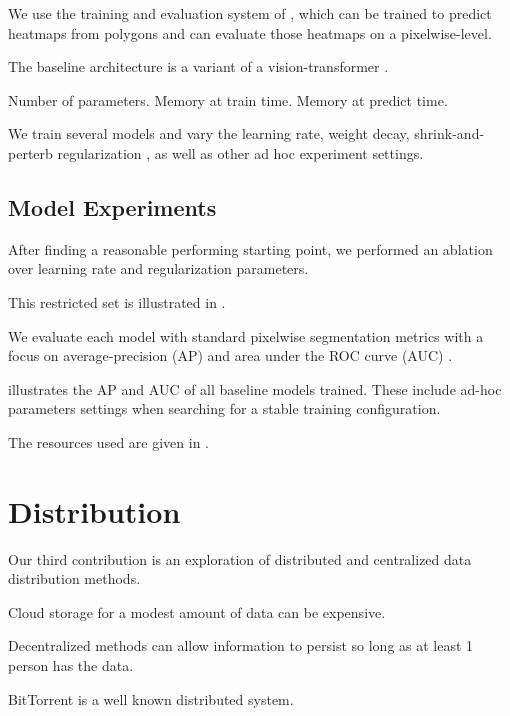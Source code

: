 \documentclass[10pt,twocolumn,letterpaper]{article}
\begin{document}
We use the training and evaluation system of \cite{crall_igarss_2024}, which
can be trained to predict heatmaps from polygons and can evaluate those
heatmaps on a pixelwise-level. 

The baseline architecture is a variant of a vision-transformer \cite{vit,split-attention,greenwell_wacv_2023}.

Number of parameters.
Memory at train time.
Memory at predict time.

We train several models and vary the learning rate, weight decay, 
shrink-and-perterb regularization \cite{warmstart}, as well as other 
ad hoc experiment settings.

\subsection{Model Experiments}

After finding a reasonable performing starting point, we performed an ablation
over learning rate and regularization parameters. 

This restricted set is illustrated in .

We evaluate each model with standard pixelwise segmentation metrics with a
focus on average-precision (AP) and  area under the ROC curve (AUC)
\cite{metrics} .

 illustrates the AP and AUC of all baseline models trained.
These include ad-hoc parameters settings when searching for a stable training
configuration.

The resources used are given in .

\section{Distribution}


Our third contribution is an exploration of distributed and centralized data distribution methods. 

Cloud storage for a modest amount of data can be expensive.

Decentralized methods can allow information to persist so long as at least 1
person has the data.

BitTorrent is a well known distributed system.
\end{document}
